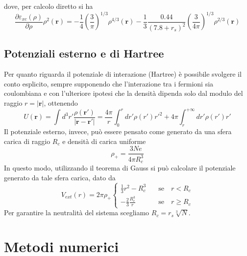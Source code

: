 \documentclass[11pt,a4paper]{article}
\begin{document}
dove, per calcolo diretto si ha
\[
\frac{\partial \varepsilon_{xc}(\rho)}{\partial\rho}\rho^2(\textbf{r}) = -\frac{1}{4}\left( \frac{3}{\pi}\right)^{1/3}\rho^{4/3}(\textbf{r}) - \frac{1}{3}\frac{0.44}{(7.8+r_s)^2}\left( \frac{3}{4\pi} \right)^{1/3}\rho^{2/3}(\textbf{r})
\]
\subsection{Potenziali esterno e di Hartree}
Per quanto riguarda il potenziale di interazione (Hartree) è possibile svolgere il conto esplicito, sempre supponendo che l'interazione tra i fermioni sia coulombiana e con l'ulteriore ipotesi che la densità dipenda solo dal modulo del raggio $r=|\textbf{r}|$, ottenendo
\begin{equation}
U(\textbf{r}) = \int d^3r' \frac{\rho(\textbf{r}')}{|\textbf{r}-\textbf{r}'|} = \frac{4\pi}{r} \int _0^r dr' \rho(r') r'^2 + 4\pi \int _r^{+\infty}dr' \rho(r') r'
\end{equation}
Il potenziale esterno, invece, può essere pensato come generato da una sfera carica di raggio $R_c$ e densità di carica uniforme
\[
\rho_+ = \frac{3Ne}{4\pi R_c^3}
\]
In questo modo, utilizzando il teorema di Gauss si può calcolare il potenziale generato da tale sfera carica, dato da
\begin{equation}
V_{ext}(r) = 2\pi \rho_+ \begin{cases}
\frac{1}{3}r^2 - R_c^3 \quad &\text{se} \quad r < R_c \\
-\frac{2}{3}\frac{R_c^3}{r} \quad &\text{se} \quad r\geq R_c
\end{cases}
\end{equation}
Per garantire la neutralità del sistema scegliamo $R_c = r_s \sqrt[3]{N}$. 

\section{Metodi numerici}
\end{document}
